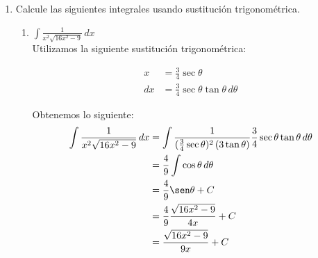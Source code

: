 \documentclass[a4paper,10pt]{article}
\newcommand{\dis}{\displaystyle}
\begin{document}
\begin{enumerate}
\begin{enumerate}[label=\emph{\alph*)}]
\end{enumerate}
\dotfill [1 punto]

\newpage
\item Calcule las siguientes integrales usando sustituci\'{o}n
trigonom\'{e}trica.
\begin{enumerate}[label=\emph{\alph*)}]
\item $\dis \int \frac{1}{x^2\sqrt{16x^2-9}}\, dx$\\

Utilizamos la siguiente sustitución trigonométrica:\\

\begin{minipage}{.3\textwidth}
\raggedright
\begin{align*}
x  &= \frac{3}{4} \sec \theta      \\
dx &= \frac{3}{4} \sec \theta \tan \theta  \, d\theta
\end{align*}
\end{minipage}%
\begin{minipage}{.3\textwidth}
\raggedleft
{}
\end{minipage}

\dotfill [1 punto]

Obtenemos lo siguiente:
\begin{align*}
 \dis \int \frac{1}{x^2\sqrt{16x^2-9}}\, dx  &=    \dis \int \frac{1}{(\frac{3}{4}\sec \theta)^2\, (3\tan \theta)} \frac{3}{4}\sec \theta \tan \theta \, d\theta\\
 									&=    \dis \frac{4}{9} \int \cos \theta \, d\theta\\
                                    &=    \dis  \frac{4}{9}  \sen \theta + C\\
                                    &=    \dis  \frac{4}{9}  \frac{\sqrt{16x^2-9}}{4x} + C\\
                                    &=    \dis  \frac{\sqrt{16x^2-9}}{9x} + C\\
\end{align*}
\dotfill [1 punto]





\end{enumerate}
\end{enumerate}
\end{document}
